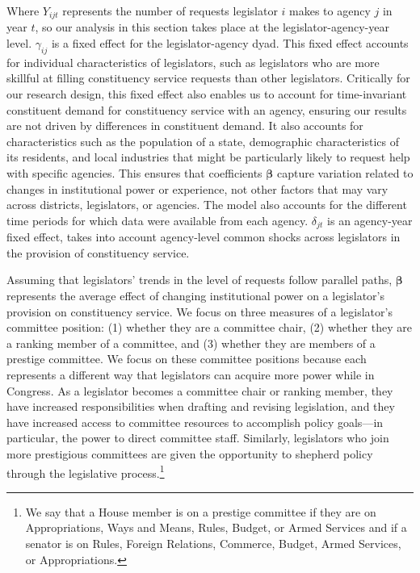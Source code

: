\documentclass[12pt]{article}
\begin{document}
Where $Y_{ijt}$ represents the number of requests legislator $i$ makes to agency $j$ in year $t$, so our analysis in this section takes place at the legislator-agency-year level. $\gamma_{ij}$ is a fixed effect for the legislator-agency dyad. This fixed effect accounts for individual characteristics of legislators, such as legislators who are more skillful at filling constituency service requests than other legislators. Critically for our research design, this fixed effect also enables us to account for time-invariant constituent demand for constituency service with an agency, ensuring our results are not driven by differences in constituent demand. It also accounts for characteristics such as the population of a state, demographic characteristics of its residents, and local industries that might be particularly likely to request help with specific agencies. This ensures that coefficients $\boldsymbol{\beta}$ capture variation related to changes in institutional power or experience, not other factors that may vary across districts, legislators, or agencies. The model also accounts for the different time periods for which data were available from each agency. $\delta_{jt}$ is an agency-year fixed effect, takes into account agency-level common shocks across legislators in the provision of constituency service. 

Assuming that legislators' trends in the level of requests follow parallel paths, $\boldsymbol{\beta}$ represents the average effect of changing institutional power on a legislator's provision on constituency service. We focus on three measures of a legislator's committee position: (1) whether they are a committee chair, (2) whether they are a ranking member of a committee, and (3) whether they are members of a prestige committee. We focus on these committee positions because each represents a different way that legislators can acquire more power while in Congress. As a legislator becomes a committee chair or ranking member, they have increased responsibilities when drafting and revising legislation, and they have increased access to committee resources to accomplish policy goals---in particular, the power to direct committee staff. Similarly, legislators who join more prestigious committees are given the opportunity to shepherd policy through the legislative process.\footnote{We say that a House member is on a prestige committee if they are on Appropriations, Ways and Means, Rules, Budget, or Armed Services and if a senator is on Rules, Foreign Relations, Commerce, Budget, Armed Services, or Appropriations.} %
\end{document}
